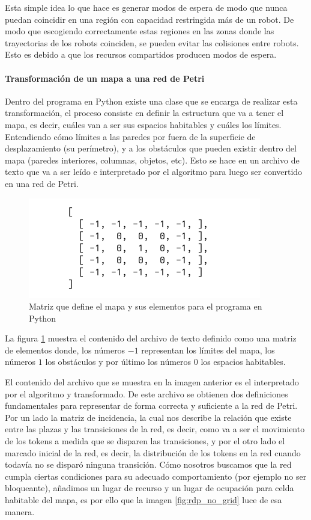 Esta simple idea lo que hace es generar modos de espera de modo que nunca puedan coincidir en una región con capacidad restringida más de un robot. De modo que escogiendo correctamente estas regiones en las zonas donde las trayectorias de los robots coinciden, se pueden evitar las colisiones entre robots. Esto es debido a que los recursos compartidos producen modos de espera.

\paragraph{Transformación de un mapa a una red de Petri} \mbox{} \vspace{8pt}

Dentro del programa en Python existe una clase que se encarga de realizar esta transformación, el proceso consiste en definir la estructura que va a tener el mapa, es decir, cuáles van a ser sus espacios habitables y cuáles los límites. Entendiendo cómo límites a las paredes por fuera de la superficie de desplazamiento (su perímetro), y a los obstáculos que pueden existir dentro del mapa (paredes interiores, columnas, objetos, etc). Esto se hace en un archivo de texto que va a ser leído e interpretado por el algoritmo para luego ser convertido en una red de Petri.

\begin{figure}[H]
   \centering
   \includegraphics[width=0.5\linewidth]{images/map_definition_matriz.png}
   \caption{Matriz que define el mapa y sus elementos para el programa en Python}
   \label{fig:map_definition}
\end{figure}

La figura \ref{fig:map_definition} muestra el contenido del archivo de texto definido como una matriz de elementos donde, los números $-1$ representan los límites del mapa, los números $1$ los obstáculos y por último los números $0$ los espacios habitables.

El contenido del archivo que se muestra en la imagen anterior es el interpretado por el algoritmo y transformado. De este archivo se obtienen dos definiciones fundamentales para representar de forma correcta y suficiente a la red de Petri. Por un lado la matriz de incidencia, la cual nos describe la relación que existe entre las plazas y las transiciones de la red, es decir, como va a ser el movimiento de los tokens a medida que se disparen las transiciones, y por el otro lado el marcado inicial de la red, es decir, la distribución de los tokens en la red cuando todavía no se disparó ninguna transición. Cómo nosotros buscamos que la red cumpla ciertas condiciones para su adecuado comportamiento (por ejemplo no ser bloqueante), añadimos un lugar de recurso y un lugar de ocupación para celda habitable del mapa, es por ello que la imagen \ref{fig:rdp_no_grid} luce de esa manera.

